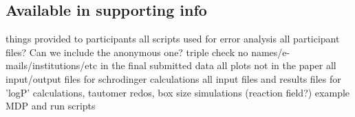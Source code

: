 \subsection{Available in supporting info} %
things provided to participants
all scripts used for error analysis
all participant files? Can we include the anonymous one? %
triple check no names/e-mails/institutions/etc in the final submitted data
all plots not in the paper
all input/output files for schrodinger calculations
all input files and results files for 'logP' calculations, tautomer redos, box size simulations (reaction field?) %
example MDP and run scripts
 





